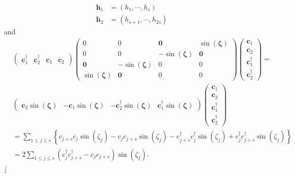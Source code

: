 \documentclass[aps, preprint]{revtex4}
\begin{document}
\begin{align}\mathbf{h}_{1} &  =\left (h_{1} ,\cdots  ,h_{s}\right ) \\
\mathbf{h}_{2} &  =\left (h_{s +1} ,\cdots  ,h_{2 s}\right )\end{align}and
\begin{align} & \left (\begin{array}{cccc}\mathbf{c}_{1}^{ \dag } & \mathbf{c}_{2}^{ \dag } & \mathbf{c}_{1} & \mathbf{c}_{2}\end{array}\right ) \left (\begin{array}{cccc}0 & 0 & \mathbf{0} & \sin  \left (\mathbf{\zeta }\right ) \\
0 & 0 &  -\sin  \left (\mathbf{\zeta }\right ) & \mathbf{0} \\
\mathbf{0} &  -\sin  \left (\mathbf{\zeta }\right ) & 0 & 0 \\
\sin  \left (\mathbf{\zeta }\right ) & \mathbf{0} & 0 & 0\end{array}\right ) \left (\begin{array}{c}\mathbf{c}_{1} \\
\mathbf{c}_{2} \\
\mathbf{c}_{1}^{ \dag } \\
\mathbf{c}_{2}^{ \dag }\end{array}\right ) = \\
 & \left (\begin{array}{cccc}\mathbf{c}_{2} \sin  \left (\mathbf{\zeta }\right ) &  -\mathbf{c}_{1} \sin  \left (\mathbf{\zeta }\right ) &  -\mathbf{c}_{2}^{ \dag } \sin  \left (\mathbf{\zeta }\right ) & \mathbf{c}_{1}^{ \dag } \sin  \left (\mathbf{\zeta }\right )\end{array}\right ) \left (\begin{array}{c}\mathbf{c}_{1} \\
\mathbf{c}_{2} \\
\mathbf{c}_{1}^{ \dag } \\
\mathbf{c}_{2}^{ \dag }\end{array}\right ) \\
 &  =\sum _{1 \leq j \leq s}\left \{c_{j +s} c_{j} \sin  \left (\zeta _{j}\right ) -c_{j} c_{j +s} \sin  \left (\zeta _{j}\right ) -c_{j +s}^{ \dag } c_{j}^{ \dag } \sin  \left (\zeta _{j}\right ) +c_{j}^{ \dag } c_{j +s}^{ \dag } \sin  \left (\zeta _{j}\right )\right \} \\
 &  =2 \sum _{1 \leq j \leq s}\left (c_{j}^{ \dag } c_{j +s}^{ \dag } -c_{j} c_{j +s}\right ) \sin  \left (\zeta _{j}\right )\text{.}\end{align}$\rfloor $ 
\end{document}
